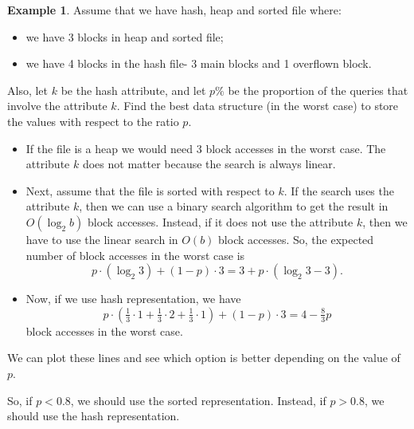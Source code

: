 \documentclass[a4paper, openany]{memoir}
\theoremstyle{definition}
\newtheorem{example}[subsection]{Example}
\begin{document}
\begin{example}
    Assume that we have hash, heap and sorted file where:
    \begin{itemize}
        \item we have 3 blocks in heap and sorted file;
        \item we have 4 blocks in the hash file- 3 main blocks and 1 overflown block.
    \end{itemize}
    Also, let $k$ be the hash attribute, and let $p\%$ be the proportion of the queries that involve the attribute $k$. Find the best data structure (in the worst case) to store the values with respect to the ratio $p$.
\end{example}
\begin{answer}
    \begin{itemize}
        \item If the file is a heap we would need 3 block accesses in the worst case. The attribute $k$ does not matter because the search is always linear. 
        
        \item Next, assume that the file is sorted with respect to $k$. If the search uses the attribute $k$, then we can use a binary search algorithm to get the result in $O(\log_2 b)$ block accesses. Instead, if it does not use the attribute $k$, then we have to use the linear search in $O(b)$ block accesses. So, the expected number of block accesses in the worst case is
        \[p \cdot (\log_2 3) + (1 - p) \cdot 3 = 3 + p \cdot (\log_2 3 - 3).\]
        
        \item Now, if we use hash representation, we have
        \[p \cdot (\tfrac{1}{3} \cdot 1 + \tfrac{1}{3} \cdot 2 + \tfrac{1}{3} \cdot 1) + (1 - p) \cdot 3 = 4 - \tfrac{8}{3} p\]
        block accesses in the worst case.
    \end{itemize}
    We can plot these lines and see which option is better depending on the value of $p$.
    \begin{figure}[H]
        \centering
    \end{figure}
    \noindent So, if $p < 0.8$, we should use the sorted representation. Instead, if $p > 0.8$, we should use the hash representation.
\end{answer}
\newpage
\end{document}
